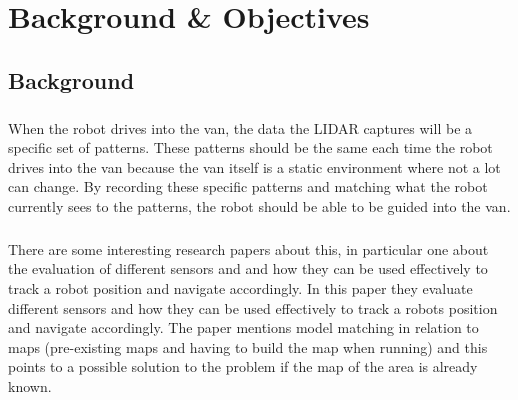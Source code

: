 \chapter{Background \& Objectives}

%
%
%
%

\section{Background}
\paragraph{}
When the robot drives into the van, the data the LIDAR captures will be a specific set of patterns. These patterns should be the same each time the robot drives into the van because the van itself is a static environment where not a lot can change. By recording these specific patterns and matching what the robot currently sees to the patterns, the robot should be able to be guided into the van.
\paragraph{}
There are some interesting research papers about this, in particular one about the evaluation of different sensors and and how they can be used effectively to track a robot position and navigate accordingly\cite{Borenstein}. In this paper they evaluate different sensors and how they can be used effectively to track a robots position and navigate accordingly. The paper mentions model matching in relation to maps (pre-existing maps and having to build the map when running) and this points to a possible solution to the problem if the map of the area is already known.
